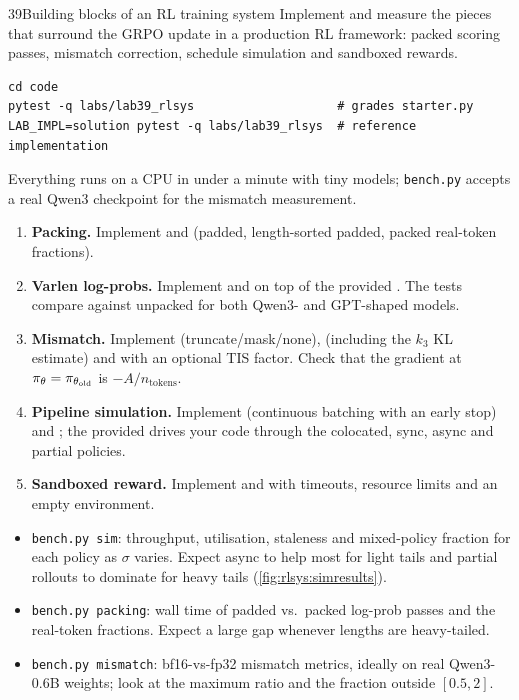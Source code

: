 \begin{labbox}{39}{Building blocks of an RL training system}
Implement and measure the pieces that surround the GRPO update in a production RL framework:
packed scoring passes, mismatch correction, schedule simulation and sandboxed rewards.

\begin{lstlisting}[style=shell]
cd code
pytest -q labs/lab39_rlsys                    # grades starter.py
LAB_IMPL=solution pytest -q labs/lab39_rlsys  # reference implementation
\end{lstlisting}
Everything runs on a CPU in under a minute with tiny models; \texttt{bench.py} accepts a real
Qwen3 checkpoint for the mismatch measurement.

\begin{enumerate}
\item \textbf{Packing.} Implement  and  (padded,
length-sorted padded, packed real-token fractions).
\item \textbf{Varlen log-probs.} Implement  and
 on top of the provided . The tests
compare against unpacked  for both Qwen3- and GPT-shaped models.
\item \textbf{Mismatch.} Implement  (truncate/mask/none),
 (including the $k_3$ KL estimate) and  with an
optional TIS factor. Check that the gradient at $\pi_\theta=\pi_{\theta_{\text{old}}}$ is $-A/n_{\text{tokens}}$.
\item \textbf{Pipeline simulation.} Implement  (continuous batching with
an early stop) and ; the provided  drives your code
through the colocated, sync, async and partial policies.
\item \textbf{Sandboxed reward.} Implement  and 
with timeouts, resource limits and an empty environment.
\end{enumerate}

\begin{itemize}
\item \texttt{bench.py sim}: throughput, utilisation, staleness and mixed-policy fraction for
each policy as $\sigma$ varies. Expect async to help most for light tails and partial rollouts
to dominate for heavy tails (\cref{fig:rlsys:simresults}).
\item \texttt{bench.py packing}: wall time of padded vs.\ packed log-prob passes and the
real-token fractions. Expect a large gap whenever lengths are heavy-tailed.
\item \texttt{bench.py mismatch}: bf16-vs-fp32 mismatch metrics, ideally on real Qwen3-0.6B
weights; look at the maximum ratio and the fraction outside $[0.5, 2]$.
\end{itemize}


\end{labbox}
